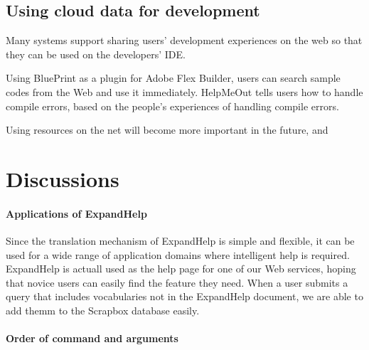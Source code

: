\documentclass{sigchi}
\def\SB{\textsf{Scrapbox}}
\def\EH{\textsf{ExpandHelp}}
\begin{document}
\subsection{Using cloud data for development}


Many systems support sharing users' development experiences on the web so that
they can be used on the developers' IDE.

Using BluePrint\cite{Brandt:2010:EPI:1753326.1753402}
as a plugin for Adobe Flex Builder,
users can search sample codes from the Web and use it immediately.
%
HelpMeOut\cite{Hartmann:2010:OPS:1753326.1753478} tells users
how to handle compile errors,
based on the people's experiences of handling compile errors.

Using resources on the net will become more important
in the future, and 


% 
% 
% 

\section{Discussions}

\paragraph{Applications of {\EH}}

Since the translation mechanism of {\EH} is simple and flexible,
it can be used for a wide range of application domains where
intelligent help is required.
{\EH} is actuall used as the help page for
one of our Web services, hoping that
novice users can easily find the feature they need.
When a user submits a query that includes vocabularies
not in the {\EH} document,
we are able to add themm to the {\SB} database easily.

\paragraph{Order of command and arguments}
\end{document}
